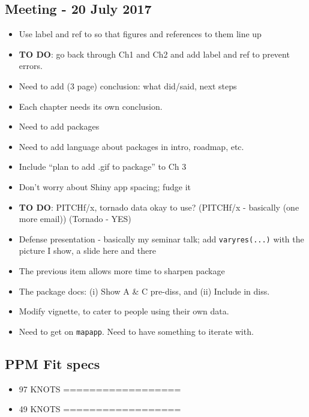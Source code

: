 \documentclass{article}
\begin{document}
\subsection*{Meeting - 20 July 2017}
\begin{itemize}
\item Use label and ref to so that figures and references to them line up
\item {\bf TO DO}: go back through Ch1 and Ch2 and add label and ref to prevent errors.
\item Need to add (3 page) conclusion: what did/said, next steps
\item Each chapter needs its own conclusion.
\item Need to add packages
\item Need to add language about packages in intro, roadmap, etc.
\item Include ``plan to add .gif to package'' to Ch 3
\item Don't worry about Shiny app spacing; fudge it
\item {\bf TO DO}: PITCHf/x, tornado data okay to use? (PITCHf/x - basically (one more email)) (Tornado - YES)
\item Defense presentation - basically my seminar talk; add \verb|varyres(...)| with the picture I show, a slide here and there
\item The previous item allows more time to sharpen package
\item The package docs: (i) Show A \& C pre-diss, and (ii) Include in diss.
\item Modify vignette, to cater to people using their own data.
\item Need to get on \verb|mapapp|. Need to have something to iterate with.
\end{itemize}

\subsection*{PPM Fit specs}
\begin{itemize}
\item 97 KNOTS ==================
\item 49 KNOTS ==================
\end{itemize}
\end{document}
